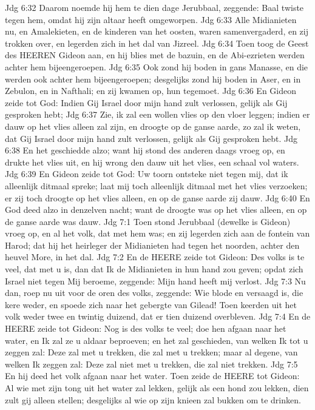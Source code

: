 Jdg 6:32  Daarom noemde hij hem te dien dage Jerubbaal, zeggende: Baal twiste tegen hem, omdat hij zijn altaar heeft omgeworpen.
Jdg 6:33  Alle Midianieten nu, en Amalekieten, en de kinderen van het oosten, waren samenvergaderd, en zij trokken over, en legerden zich in het dal van Jizreel.
Jdg 6:34  Toen toog de Geest des HEEREN Gideon aan, en hij blies met de bazuin, en de Abi-ezrieten werden achter hem bijeengeroepen.
Jdg 6:35  Ook zond hij boden in gans Manasse, en die werden ook achter hem bijeengeroepen; desgelijks zond hij boden in Aser, en in Zebulon, en in Nafthali; en zij kwamen op, hun tegemoet.
Jdg 6:36  En Gideon zeide tot God: Indien Gij Israel door mijn hand zult verlossen, gelijk als Gij gesproken hebt;
Jdg 6:37  Zie, ik zal een wollen vlies op den vloer leggen; indien er dauw op het vlies alleen zal zijn, en droogte op de ganse aarde, zo zal ik weten, dat Gij Israel door mijn hand zult verlossen, gelijk als Gij gesproken hebt.
Jdg 6:38  En het geschiedde alzo; want hij stond des anderen daags vroeg op, en drukte het vlies uit, en hij wrong den dauw uit het vlies, een schaal vol waters.
Jdg 6:39  En Gideon zeide tot God: Uw toorn ontsteke niet tegen mij, dat ik alleenlijk ditmaal spreke; laat mij toch alleenlijk ditmaal met het vlies verzoeken; er zij toch droogte op het vlies alleen, en op de ganse aarde zij dauw.
Jdg 6:40  En God deed alzo in denzelven nacht; want de droogte was op het vlies alleen, en op de ganse aarde was dauw.
Jdg 7:1  Toen stond Jerubbaal (dewelke is Gideon) vroeg op, en al het volk, dat met hem was; en zij legerden zich aan de fontein van Harod; dat hij het heirleger der Midianieten had tegen het noorden, achter den heuvel More, in het dal.
Jdg 7:2  En de HEERE zeide tot Gideon: Des volks is te veel, dat met u is, dan dat Ik de Midianieten in hun hand zou geven; opdat zich Israel niet tegen Mij beroeme, zeggende: Mijn hand heeft mij verlost.
Jdg 7:3  Nu dan, roep nu uit voor de oren des volks, zeggende: Wie blode en versaagd is, die kere weder, en spoede zich naar het gebergte van Gilead! Toen keerden uit het volk weder twee en twintig duizend, dat er tien duizend overbleven.
Jdg 7:4  En de HEERE zeide tot Gideon: Nog is des volks te veel; doe hen afgaan naar het water, en Ik zal ze u aldaar beproeven; en het zal geschieden, van welken Ik tot u zeggen zal: Deze zal met u trekken, die zal met u trekken; maar al degene, van welken Ik zeggen zal: Deze zal niet met u trekken, die zal niet trekken.
Jdg 7:5  En hij deed het volk afgaan naar het water. Toen zeide de HEERE tot Gideon: Al wie met zijn tong uit het water zal lekken, gelijk als een hond zou lekken, dien zult gij alleen stellen; desgelijks al wie op zijn knieen zal bukken om te drinken.
